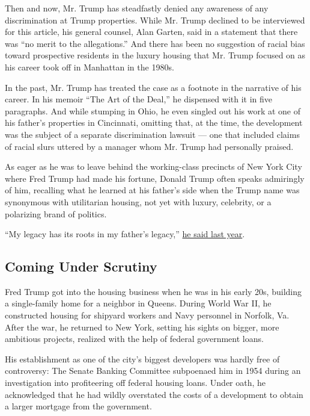 Then and now, Mr. Trump has steadfastly denied any awareness of any
discrimination at Trump properties. While Mr. Trump declined to be
interviewed for this article, his general counsel, Alan Garten, said in
a statement that there was ``no merit to the allegations.'' And there
has been no suggestion of racial bias toward prospective residents in
the luxury housing that Mr. Trump focused on as his career took off in
Manhattan in the 1980s.

In the past, Mr. Trump has treated the case as a footnote in the
narrative of his career. In his memoir ``The Art of the Deal,'' he
dispensed with it in five paragraphs. And while stumping in Ohio, he
even singled out his work at one of his father's properties in
Cincinnati, omitting that, at the time, the development was the subject
of a separate discrimination lawsuit --- one that included claims of
racial slurs uttered by a manager whom Mr. Trump had personally praised.

As eager as he was to leave behind the working-class precincts of New
York City where Fred Trump had made his fortune, Donald Trump often
speaks admiringly of him, recalling what he learned at his father's side
when the Trump name was synonymous with utilitarian housing, not yet
with luxury, celebrity, or a polarizing brand of politics.

``My legacy has its roots in my father's legacy,''
\href{https://www.washingtonpost.com/news/wonk/wp/2015/08/10/the-middle-class-housing-empire-donald-trump-abandoned-for-luxury-building/}{he
said last year}.

\hypertarget{coming-under-scrutiny}{%
\subsection{Coming Under Scrutiny}\label{coming-under-scrutiny}}

Fred Trump got into the housing business when he was in his early 20s,
building a single-family home for a neighbor in Queens. During World War
II, he constructed housing for shipyard workers and Navy personnel in
Norfolk, Va. After the war, he returned to New York, setting his sights
on bigger, more ambitious projects, realized with the help of federal
government loans.

His establishment as one of the city's biggest developers was hardly
free of controversy: The Senate Banking Committee subpoenaed him in 1954
during an investigation into profiteering off federal housing loans.
Under oath, he acknowledged that he had wildly overstated the costs of a
development to obtain a larger mortgage from the government.

